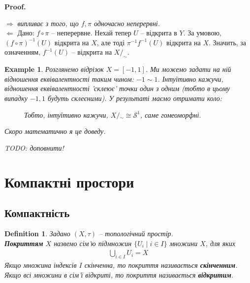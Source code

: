 \documentclass[a4paper, 10pt]{article}
\makeatletter
\def\rightproof{$\boxed{\Rightarrow}$ }
\def\leftproof{$\boxed{\Leftarrow}$ }
\theoremstyle{theoremdd}
\newtheorem{definition}[theorem]{Definition}
\newtheorem{example}[theorem]{Example}
\renewenvironment{proof}[1][Proof.\\]{\par
\pushQED{\hfill \qed}%
\normalfont \topsep6\p@\@plus6\p@\relax
\trivlist
\item\relax
{\bfseries
#1\@addpunct{.}}\hspace\labelsep\ignorespaces
}{%
\popQED\endtrivlist\@endpefalse
}
\makeatother
\begin{document}
\begin{proof}
\rightproof \textit{випливає з того, що $f,\pi$ одночасно неперервні.}
\bigskip \\
\leftproof Дано: $f \circ \pi$ -- неперервне. Нехай тепер $U$ -- відкрита в $Y$. За умовою, $(f \circ \pi)^{-1}(U)$ відкрита на $X$, але тоді $\pi^{-1} f^{-1}(U)$ відкрита на $X$. Значить, за означенням, $f^{-1}(U)$ -- відкрита на $X/_\sim$.
\end{proof}

\begin{example}
Розглянемо відрізок $X = [-1,1]$. Ми можемо задати на ній відношення еквівалентності таким чином: $-1 \sim 1$. Інтуїтивно кажучи, відношення еквівалентності 'склеює' точки один з одним (тобто в цьому випадку $-1,1$ будуть склеєними). У результаті маємо отримати коло:
\begin{figure}[H]
\centering
{}
\qquad
{}
\caption*{Тобто, інтуїтивно кажучи, $X/{_\sim} \cong \mathcal{S}^1$, саме гомеоморфні.}
\end{figure}
\noindent Скоро математично я це доведу.
\end{example}
\noindent \textit{TODO: доповнити!}

\newpage
\section{Компактні простори}
\subsection{Компактність}
\begin{definition}
Задано $(X,\tau)$ -- топологічний простір.\\
\textbf{Покриттям} $X$ назвемо сім'ю підмножин $\{U_i \mid i \in I\}$ множини $X$, для яких
\begin{align*}
\bigcup_{i \in I} U_i = X
\end{align*}
Якщо множина індексів $I$ скінченна, то покриття називається \textbf{скінченним}. Якщо всі множини в сім'ї відкриті, то покриття називається \textbf{відкритим}.
\end{definition}
\end{document}
